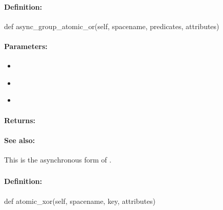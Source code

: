 \paragraph{Definition:}
\begin{pythoncode}
def async_group_atomic_or(self, spacename, predicates, attributes)
\end{pythoncode}

\paragraph{Parameters:}
\begin{itemize}[noitemsep]
\item {}\\

\item {}\\

\item {}\\

\end{itemize}

\paragraph{Returns:}


\paragraph{See also:}  This is the asynchronous form of .

\pagebreak
\subsubsection{}
\label{api:python:atomic_xor}


\paragraph{Definition:}
\begin{pythoncode}
def atomic_xor(self, spacename, key, attributes)
\end{pythoncode}

